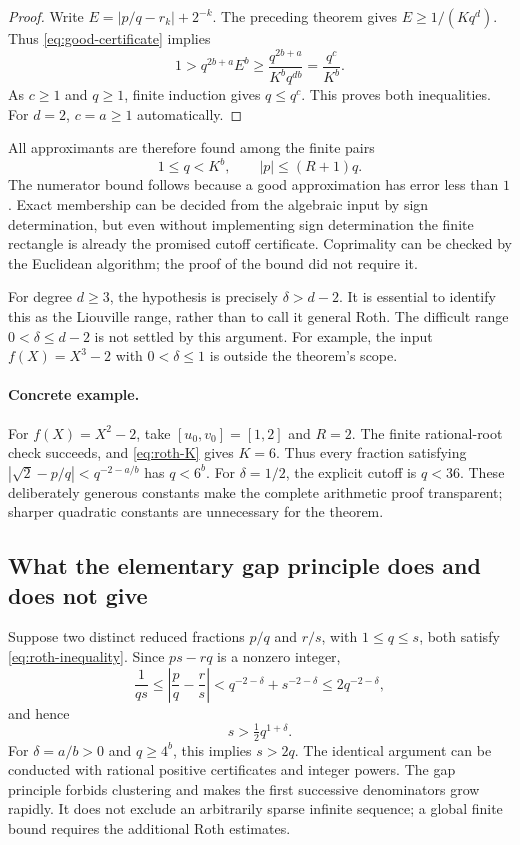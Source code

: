 \begin{proof}
Write $E=|p/q-r_k|+2^{-k}$.  The preceding theorem gives
$E\geq1/(Kq^d)$.  Thus \eqref{eq:good-certificate} implies
\[
 1>q^{2b+a}E^b
   \geq\frac{q^{2b+a}}{K^bq^{db}}
   =\frac{q^c}{K^b}.
\]
As $c\geq1$ and $q\geq1$, finite induction gives $q\leq q^c$.
This proves both inequalities.  For $d=2$, $c=a\geq1$ automatically.
\end{proof}

All approximants are therefore found among the finite pairs
\[
 1\leq q<K^b,\qquad |p|\leq (R+1)q.
\]
The numerator bound follows because a good approximation has error less
than $1$.  Exact membership can be decided from the algebraic input by
sign determination, but even without implementing sign determination the
finite rectangle is already the promised cutoff certificate.  Coprimality
can be checked by the Euclidean algorithm; the proof of the bound did not
require it.

For degree $d\geq3$, the hypothesis is precisely
$\delta>d-2$.  It is essential to identify this as the Liouville range,
rather than to call it general Roth.  The difficult range
$0<\delta\leq d-2$ is not settled by this argument.  For example, the input
$f(X)=X^3-2$ with $0<\delta\leq1$ is outside the theorem's scope.

\paragraph{Concrete example.}
For $f(X)=X^2-2$, take $[u_0,v_0]=[1,2]$ and $R=2$.
The finite rational-root check succeeds, and \eqref{eq:roth-K} gives $K=6$.
Thus every fraction satisfying
$|\sqrt2-p/q|<q^{-2-a/b}$ has $q<6^b$.
For $\delta=1/2$, the explicit cutoff is $q<36$.
These deliberately generous constants make the complete arithmetic proof
transparent; sharper quadratic constants are unnecessary for the theorem.

\subsection{What the elementary gap principle does and does not give}

Suppose two distinct reduced fractions $p/q$ and $r/s$, with $1\leq q\leq s$,
both satisfy \eqref{eq:roth-inequality}.  Since $ps-rq$ is a nonzero integer,
\[
 \frac1{qs}\leq\left|\frac pq-\frac rs\right|
 <q^{-2-\delta}+s^{-2-\delta}\leq2q^{-2-\delta},
\]
and hence
\begin{equation}\label{eq:gap-principle}
 s>\tfrac12q^{1+\delta}.
\end{equation}
For $\delta=a/b>0$ and $q\geq4^b$, this implies $s>2q$.
The identical argument can be conducted with rational positive certificates
and integer powers.  The gap principle forbids clustering and makes the
first successive denominators grow rapidly.  It does not exclude an
arbitrarily sparse infinite sequence; a global finite bound requires the
additional Roth estimates.

